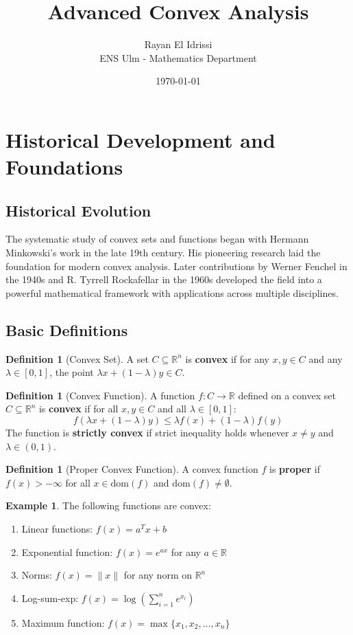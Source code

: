 \documentclass[12pt,a4paper]{article}
\title{Advanced Convex Analysis}
\author{Rayan El Idrissi\\ENS Ulm - Mathematics Department}
\date{\today}
\theoremstyle{definition}
\newtheorem{definition}[theorem]{Definition}
\newtheorem{example}{Example}[section]
\begin{document}
\maketitle
\tableofcontents
\newpage

\section{Historical Development and Foundations}

\subsection{Historical Evolution}
The systematic study of convex sets and functions began with Hermann Minkowski's work in the late 19th century. His pioneering research laid the foundation for modern convex analysis. Later contributions by Werner Fenchel in the 1940s and R. Tyrrell Rockafellar in the 1960s developed the field into a powerful mathematical framework with applications across multiple disciplines.

\subsection{Basic Definitions}

\begin{definition}[Convex Set]
A set $C \subseteq \mathbb{R}^n$ is \textbf{convex} if for any $x, y \in C$ and any $\lambda \in [0,1]$, the point $\lambda x + (1-\lambda)y \in C$.
\end{definition}

\begin{definition}[Convex Function]
A function $f: C \to \mathbb{R}$ defined on a convex set $C \subseteq \mathbb{R}^n$ is \textbf{convex} if for all $x, y \in C$ and all $\lambda \in [0,1]$:
\[f(\lambda x + (1-\lambda)y) \leq \lambda f(x) + (1-\lambda)f(y)\]
The function is \textbf{strictly convex} if strict inequality holds whenever $x \neq y$ and $\lambda \in (0,1)$.
\end{definition}

\begin{definition}[Proper Convex Function]
A convex function $f$ is \textbf{proper} if $f(x) > -\infty$ for all $x \in \text{dom}(f)$ and $\text{dom}(f) \neq \emptyset$.
\end{definition}

\begin{example}
The following functions are convex:
\begin{enumerate}[label=(\roman*)]
\item Linear functions: $f(x) = a^T x + b$
\item Exponential function: $f(x) = e^{ax}$ for any $a \in \mathbb{R}$
\item Norms: $f(x) = \|x\|$ for any norm on $\mathbb{R}^n$
\item Log-sum-exp: $f(x) = \log(\sum_{i=1}^n e^{x_i})$
\item Maximum function: $f(x) = \max\{x_1, x_2, \ldots, x_n\}$
\end{enumerate}
\end{example}
\end{document}
